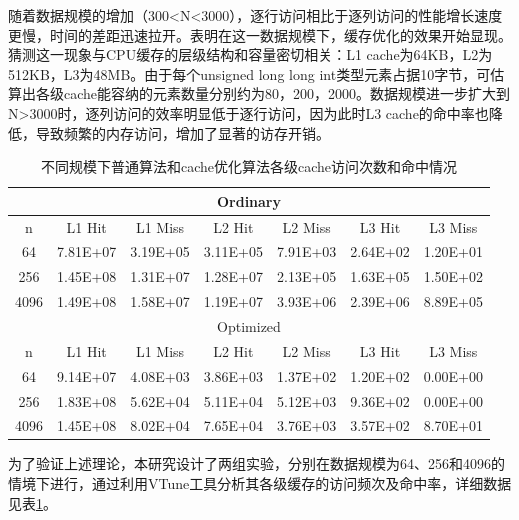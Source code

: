 \documentclass[a4paper]{article}
\begin{document}
                随着数据规模的增加（300<N<3000），逐行访问相比于逐列访问的性能增长速度更慢，时间的差距迅速拉开。表明在这一数据规模下，缓存优化的效果开始显现。猜测这一现象与CPU缓存的层级结构和容量密切相关：L1 cache为64KB，L2为512KB，L3为48MB。由于每个unsigned long long int类型元素占据10字节，可估算出各级cache能容纳的元素数量分别约为80，200，2000。数据规模进一步扩大到N>3000时，逐列访问的效率明显低于逐行访问，因为此时L3 cache的命中率也降低，导致频繁的内存访问，增加了显著的访存开销。
                \begin{table}[h]
                    \centering
                    \caption{不同规模下普通算法和cache优化算法各级cache访问次数和命中情况}
                    \label{tab:cache_performance}
                    \begin{tabular}{|c|c|c|c|c|c|c|}
                    \hline
                    \multicolumn{7}{|c|}{Ordinary} \\
                    \hline
                    n & L1 Hit & L1 Miss & L2 Hit & L2 Miss & L3 Hit & L3 Miss \\
                    \hline
                    64 & 7.81E+07 & 3.19E+05 & 3.11E+05 & 7.91E+03 & 2.64E+02 & 1.20E+01 \\
                    256 & 1.45E+08 & 1.31E+07 & 1.28E+07 & 2.13E+05 & 1.63E+05 & 1.50E+02 \\
                    4096 & 1.49E+08 & 1.58E+07 & 1.19E+07 & 3.93E+06 & 2.39E+06 & 8.89E+05 \\
                    \hline
                    \multicolumn{7}{|c|}{Optimized} \\
                    \hline
                    n & L1 Hit & L1 Miss & L2 Hit & L2 Miss & L3 Hit & L3 Miss \\
                    \hline
                    64 & 9.14E+07 & 4.08E+03 & 3.86E+03 & 1.37E+02 & 1.20E+02 & 0.00E+00 \\
                    256 & 1.83E+08 & 5.62E+04 & 5.11E+04 & 5.12E+03 & 9.36E+02 & 0.00E+00 \\
                    4096 & 1.45E+08 & 8.02E+04 & 7.65E+04 & 3.76E+03 & 3.57E+02 & 8.70E+01 \\
                    \hline
                    \end{tabular}
                \end{table}
                
为了验证上述理论，本研究设计了两组实验，分别在数据规模为64、256和4096的情境下进行，通过利用VTune工具分析其各级缓存的访问频次及命中率，详细数据见表\ref{tab:cache_performance}。
\end{document}
